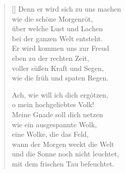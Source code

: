 \begin{multicols}{2}
\begin{verse}[\versewidth]
 Denn er wird sich zu uns machen\\
wie die schöne Morgenröt,\\
über welche Lust und Lachen\\
bei der ganzen Welt entsteht.\\
Er wird kommen uns zur Freud\\
eben zu der rechten Zeit,\\
voller süßen Kraft und Segen,\\
wie die früh und spaten Regen.

 Ach, wie will ich dich ergötzen,\\
o mein hochgeliebtes Volk!\\
Meine Gnade soll dich netzen\\
wie ein ausgespannte Wolk,\\
eine Wolke, die das Feld,\\
wann der Morgen weckt die Welt\\
und die Sonne noch nicht leuchtet,\\
mit dem frischen Tau befeuchtet.
   
\end{verse}
\end{multicols}
